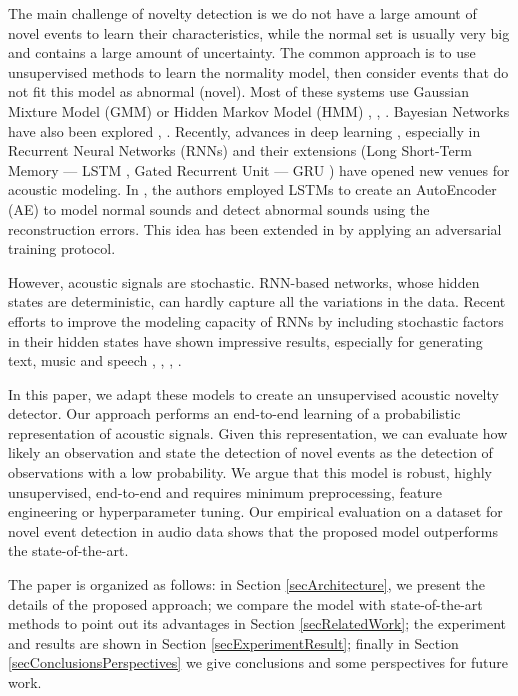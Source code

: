 \documentclass{article}
\begin{document}
The main challenge of novelty detection is we do not have a large amount of novel events to learn their characteristics, while the normal set is usually very big and contains a large amount of uncertainty. 
The common approach is to use unsupervised methods to learn the normality model, then consider events that do not fit this model as abnormal (novel). Most of these systems use Gaussian Mixture Model (GMM) or Hidden Markov Model (HMM) \cite{kumar_multimodal_2005}, \cite{ntalampiras_probabilistic_2011}, \cite{atrey_audio_2006}. Bayesian Networks have also been explored \cite{zajdel_cassandra:_2007}, \cite{giannakopoulos_audio-visual_2010}. Recently, advances in deep learning \cite{lecun_deep_2015}, especially in Recurrent Neural Networks (RNNs) and their extensions (Long Short-Term Memory --- LSTM \cite{sak_long_2014}, Gated Recurrent Unit --- GRU \cite{chung_gated_2015}) have opened new venues for acoustic modeling. 
In \cite{marchi_novel_2015}, the authors employed LSTMs to create an AutoEncoder (AE) to model normal sounds and detect abnormal sounds using the reconstruction errors. This idea has been extended in \cite{principi_acoustic_2017} by applying an adversarial training protocol. 


However, acoustic signals are stochastic. RNN-based networks, whose hidden states are deterministic, can hardly capture all the variations in the data.
Recent efforts to improve the modeling capacity of RNNs by including stochastic factors in their hidden states have shown impressive 
results, especially for generating text, music and speech \cite{bayer_learning_2014}, \cite{boulanger-lewandowski_modeling_2012}, \cite{chung_recurrent_2015}, \cite{fraccaro_sequential_2016}.


In this paper, we adapt these models to create an unsupervised acoustic novelty detector. 
Our approach performs an end-to-end learning of a probabilistic representation of acoustic signals.  
Given this representation, 
we can evaluate how likely an observation and state the detection of novel events as the detection of observations with a low probability.
We argue that this model is robust, highly unsupervised, end-to-end and requires minimum preprocessing, feature engineering or hyperparameter tuning. Our empirical evaluation on a dataset for novel event detection in audio data shows that the proposed model outperforms the state-of-the-art. 


The paper is organized as follows: in Section \ref{secArchitecture}, we present the details of the proposed approach; we compare the model with state-of-the-art methods to point out its advantages in Section \ref{secRelatedWork}; the experiment and results are shown in Section \ref{secExperimentResult}; finally in Section \ref{secConclusionsPerspectives} we give  conclusions and some perspectives for future work.
\end{document}
